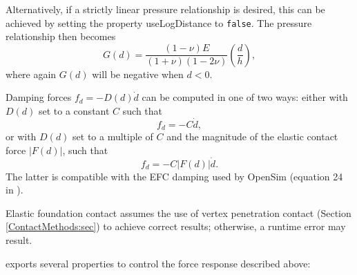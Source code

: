 Alternatively, if a strictly linear pressure relationship is desired,
this can be achieved by setting the property {\sf useLogDistance} 
to {\tt false}. The pressure relationship then becomes
%
\begin{equation}
G(d) = \frac{(1-\nu) E}{(1+\nu)(1-2 \nu)}\left(\frac{d}{h}\right),
\label{linearEFC:eqn}
\end{equation}
%
where again $G(d)$ will be negative when $d < 0$.

Damping forces $f_d = -D(d) \dot d$ can be computed in one of two ways: either
with $D(d)$ set to a constant $C$ such that
%
\begin{equation}
f_d = - C \dot d,
\label{directDamping:eqn}
\end{equation}
%
or with $D(d)$ set to a multiple of $C$ and the magnitude of the
elastic contact force $|F(d)|$, such that
%
\begin{equation}
f_d = - C |F(d)| \dot d.
\label{forceDamping:eqn}
\end{equation}
%
The latter is compatible with the EFC damping used by
OpenSim (equation 24 in \cite{sherman2011simbody}).

\begin{sideblock}
Elastic foundation contact assumes the use of vertex penetration
contact (Section \ref{ContactMethods:sec}) to achieve correct
results; otherwise, a runtime error may result.
\end{sideblock}

exports several properties to control the force response described
above:

